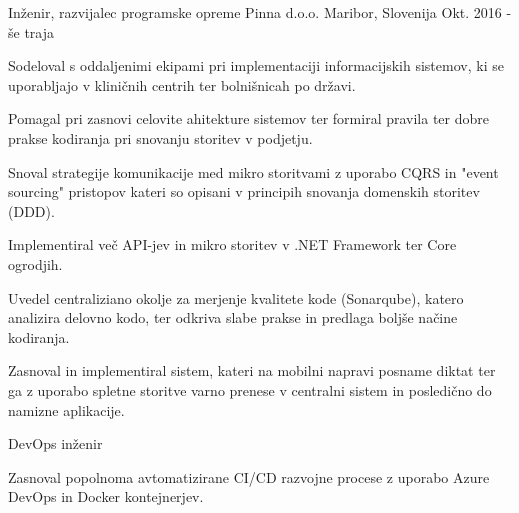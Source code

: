 

\begin{cventries}

  \cventry
    {Inženir, razvijalec programske opreme} %
    {Pinna d.o.o.} %
    {Maribor, Slovenija} %
    {Okt. 2016 - še traja} %
    {
      \begin{cvitems} %
        \item {Sodeloval s oddaljenimi ekipami pri implementaciji 
        informacijskih sistemov, ki se uporabljajo v kliničnih 
        centrih ter bolnišnicah po državi.}
        \item {Pomagal pri zasnovi celovite ahitekture sistemov ter 
        formiral pravila ter dobre prakse kodiranja pri snovanju storitev v podjetju.}
        \item {Snoval strategije komunikacije med mikro storitvami z uporabo 
        CQRS in "event sourcing" pristopov kateri so opisani v principih 
        snovanja domenskih storitev (DDD).}
        \item {Implementiral več API-jev in mikro storitev v .NET Framework 
        ter Core ogrodjih.}
        \item {Uvedel centraliziano okolje za merjenje kvalitete kode 
        (Sonarqube), katero analizira delovno kodo, ter odkriva slabe 
        prakse in predlaga boljše načine kodiranja.}
        \item {Zasnoval in implementiral sistem, kateri na mobilni
         napravi posname diktat ter ga z uporabo spletne storitve varno
          prenese v centralni sistem in posledično do namizne aplikacije.\\}
      \end{cvitems}
    }
    \cventry
    {DevOps inženir} %
    {} %
    {} %
    {} %
    {
      \begin{cvitems} %
        \item {Zasnoval popolnoma avtomatizirane CI/CD razvojne procese z 
        uporabo Azure DevOps in Docker kontejnerjev.}

\end{cvitems}}
\end{cventries}
